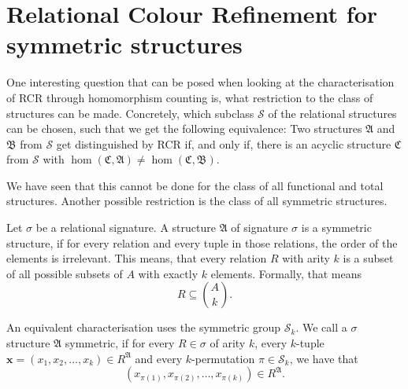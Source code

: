 \section {Relational Colour Refinement for symmetric structures}
\label{sec:RelationalColourRefinementForSymmetricStructures}

One interesting question that can be posed when looking at the characterisation of RCR through homomorphism counting is, what restriction to the class of structures can be made.
Concretely, which subclass $\mathcal S$ of the relational structures can be chosen, such that we get the following equivalence:
Two structures $\mathfrak A$ and $\mathfrak B$ from $\mathcal S$ get distinguished by RCR if, and only if, there is an acyclic structure $\mathfrak C$ from $\mathcal S$ with $\hom(\mathfrak C, \mathfrak A)\neq \hom(\mathfrak C, \mathfrak B)$.

We have seen that this cannot be done for the class of all functional and total structures.
Another possible restriction is the class of all symmetric structures.

\begin{definition}
	Let $\sigma$ be a relational signature.
	A structure $\mathfrak A$ of signature $\sigma$ is a symmetric structure, if for every relation and every tuple in those relations, the order of the elements is irrelevant.
	This means, that every relation $R$ with arity $k$ is a subset of all possible subsets of $A$ with exactly $k$ elements.
	Formally, that means
	$$R\subseteq \binom{A}{k}.$$
\end{definition}
An equivalent characterisation uses the symmetric group $\mathcal S_k$.
We call a $\sigma$ structure $\mathfrak A$ symmetric, if for every $R\in \sigma$ of arity $k$, every $k$-tuple $\mathbf x=(x_1,x_2,\dots,x_k)\in R^{\mathfrak A}$ and every $k$-permutation $\pi\in \mathcal S_k$, we have that
$$(x_{\pi(1)},x_{\pi(2)},\dots,x_{\pi(k)})\in R^{\mathfrak A}.$$

